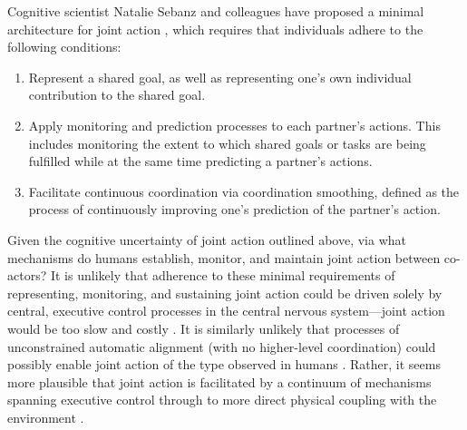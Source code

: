 \begin{CJK}{UTF8}{gbsn}
Cognitive scientist Natalie Sebanz and colleagues have proposed a minimal architecture for joint action \citep{Sebanz2006,Vesper2010}, which requires that individuals adhere to the following conditions:

\begin{enumerate}
  \item Represent a shared goal, as well as representing one’s own individual contribution to the shared goal.
  \item Apply monitoring and prediction processes to each partner’s actions. This includes monitoring the extent to which shared goals or tasks are being fulfilled while at the same time predicting a partner’s actions.
  \item Facilitate continuous coordination via coordination smoothing, defined as the process of continuously improving one’s prediction of the partner’s action.
\end{enumerate}

Given the cognitive uncertainty of joint action outlined above, via what mechanisms do humans establish, monitor, and maintain joint action between co-actors? It is unlikely that adherence to these minimal requirements of representing, monitoring, and sustaining joint action could be driven solely by central, executive control processes in the central nervous system---joint action would be too slow and costly \citep{Dietrich2004b}.  It is similarly unlikely that processes of unconstrained automatic alignment (with no higher-level coordination) could possibly enable joint action of the type observed in humans \citep{Fusaroli2014}.  Rather, it seems more plausible that joint action is facilitated by a continuum of mechanisms spanning executive control through to more direct physical coupling with the environment \citep{Frith2008}.


\end{CJK}
